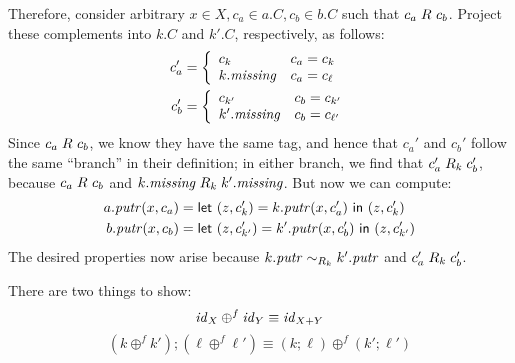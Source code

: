 \begin{defn}[$R$-similarity]
\begin{theorem}
\begin{lemma}
\begin{theorem}[No products]
\begin{lemma}
\begin{lenseqv}
Therefore, consider arbitrary $x \in X, c_a \in a.C, c_b \in b.C$ such that
$c_a \mathrel{R_{}} c_b$. Project these complements into $k.C$ and $k'.C$,
respectively, as follows:
\begin{align*}
    c_a' &= \left\{\begin{array}{ll}
        c_k & c_a =  c_k \\
        k.\mathit{missing} & c_a =  c_\ell
    \end{array}\right. \\
    c_b' &= \left\{\begin{array}{ll}
        c_{k'} & c_b =  c_{k'} \\
        k'.\mathit{missing} & c_b =  c_{\ell'}
    \end{array}\right.
\end{align*}
Since $c_a \mathrel{R_{}} c_b$, we know they have the same tag, and hence that $c_a'$
and $c_b'$ follow the same ``branch'' in their definition; in either branch,
we find that $c_a' \mathrel{R_{k}} c_b'$, because $c_a \mathrel{R_{}} c_b$ and $k.\mathit{missing}
\mathrel{R_{k}} k'.\mathit{missing}$. But now we can compute:
\begin{align*}
    a.\mathit{putr}(x,c_a) &= \mathsf{let}\  (z,c_k') = k.\mathit{putr}(x,c_a') \ \mathsf{in}\  ( z, c_k') \\
    b.\mathit{putr}(x,c_b) &= \mathsf{let}\  (z,c_{k'}') = k'.\mathit{putr}(x,c_b') \ \mathsf{in}\  ( z,  c_{k'}')
\end{align*}
The desired properties now arise because $k.\mathit{putr} \sim_{R_k} k'.\mathit{putr}$ and
$c_a' \mathrel{R_{k}} c_b'$.
\end{lenseqv}

\begin{functoriality}
There are two things to show:
\[\mathit{id}_X \oplus^f \mathit{id}_Y \equiv \mathit{id}_{X+Y}\]
\[(k \oplus^f k');(\ell \oplus^f \ell') \equiv (k;\ell)\oplus^f(k';\ell')\]


\end{functoriality}
\end{lemma}
\end{theorem}
\end{lemma}
\end{theorem}
\end{defn}
